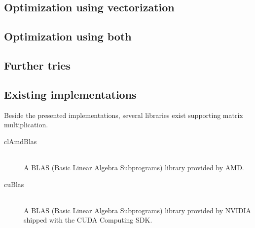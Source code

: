 \subsection{Optimization using vectorization}





\subsection{Optimization using both}



\subsection{Further tries}



\subsection{Existing implementations}

Beside the presented implementations, several libraries exist supporting matrix multiplication.

\begin{description}
   \item[clAmdBlas] \hfill \\
   A BLAS (Basic Linear Algebra Subprograms) library provided by AMD.
   \item[cuBlas] \hfill \\
   A BLAS (Basic Linear Algebra Subprograms) library provided by NVIDIA shipped with the CUDA Computing SDK.
\end{description}


